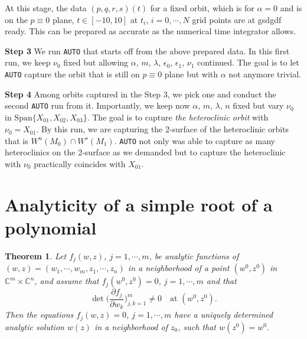 \documentclass[a4paper,11pt]{article}
\newtheorem{theorem}{Theorem}
\theoremstyle{remark}
\begin{document}
At this stage, the data $(p,q,r,s)(t)$ for a fixed orbit, which is for $\alpha=0$ and is on the $p\equiv0$ plane,  $t\in[-10,10]$ at $t_i$, $i=0,\cdots,N$ grid points are at gsdgdf ready. This can be prepared as accurate as the numerical time integrator allows.

{\bf \noindent Step 3}
We run \texttt{AUTO} that starts off from the above prepared data. In this first run, we keep $\nu_0$ fixed but allowing $\alpha$, $m$, $\lambda$, $\epsilon_0$, $\epsilon_1$, $\nu_1$ continued.  The goal is to let \texttt{AUTO} capture the orbit that is still on $p\equiv0$ plane but with $\alpha$ not anymore trivial.

{\bf \noindent Step 4}
Among orbits captured in the Step 3, we pick one and conduct the second \texttt{AUTO} run from it. Importantly, we keep now $\alpha$, $m$, $\lambda$, $n$ fixed but vary $\nu_0$ in $\underset{}{ \textrm{Span}}\{X_{01},X_{02},X_{03}\}$. The goal is to capture {\it the heteroclinic orbit} with $\nu_0=X_{01}$. By this run, we are capturing the 2-surface of the heteroclinic orbits that is $W^u(M_0)\cap W^s(M_1)$. \texttt{AUTO} not only was able to capture as many heteroclinics on the 2-surface as we demanded but to capture the heteroclinic with $\nu_0$ practically coincides with $X_{01}$.

\pagebreak
\appendix
\renewcommand\thetheorem{\Alph{theorem}}
\setcounter{theorem}{\thetmp}
\section{Analyticity of a simple root of a polynomial}



\begin{theorem}{\cite[p. 24]{L1966}} \label{thm:anal} Let $f_j(w,z)$, $j=1,\cdots,m$, be analytic functions of $(w,z)=(w_1,\cdots,w_m,z_1,\cdots,z_n)$ in a neighborhood of a point $(w^0,z^0)$ in $\mathbb{C}^m\times \mathbb{C}^n$, and assume that $f_j(w^0,z^0)=0$, $j=1,\cdots,m$ and that
$$ \det\Big( \frac{\partial f_j}{\partial w_k} \Big)_{j,k=1}^m \ne 0 \quad \text{at $(w^0,z^0)$}.$$
Then the equations $f_j(w,z)=0$, $j=1,\cdots,m$ have a uniquely determined analytic solution $w(z)$ in a neighborhood of $z_0$, such that $w(z^0)=w^0$.
\end{theorem}
\end{document}
